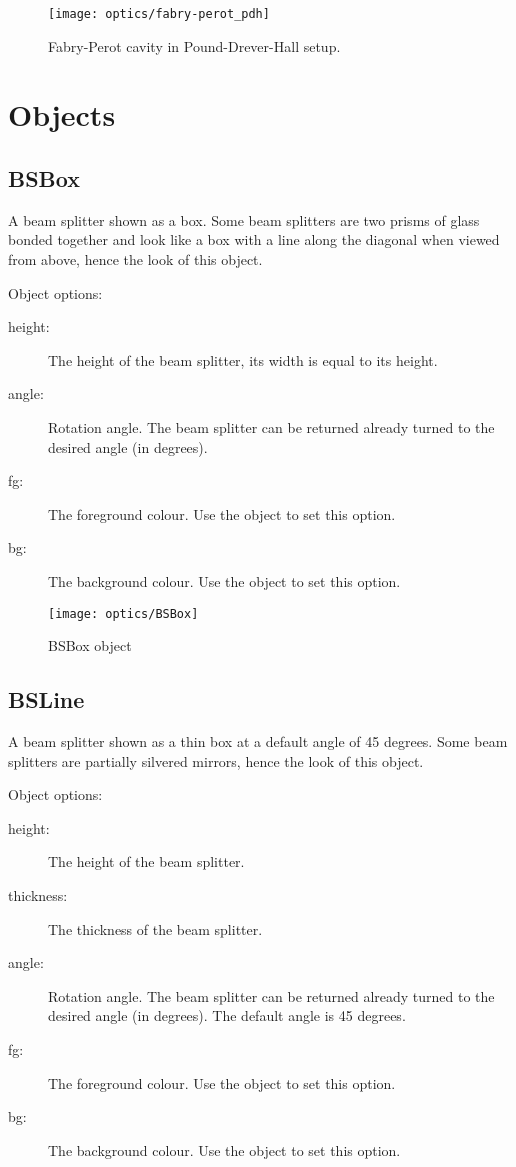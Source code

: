 \begin{figure}[ht]
\centerline{\texttt{[image: optics/fabry-perot\_pdh]}}
\caption{Fabry-Perot cavity in Pound-Drever-Hall setup.}
\label{fig:fabry-perot-pdh}
\end{figure}

\section{Objects}

\subsection{BSBox}

A beam splitter shown as a box.  Some beam splitters are two prisms of glass
bonded together and look like a box with a line along the diagonal
when viewed from above, hence the look of this object.

Object options:
\begin{description}
\item[height:] The height of the beam splitter, its width is equal to its
height.
\item[angle:] Rotation angle.  The beam splitter can be returned already
turned to the desired angle (in degrees).
\item[fg:] The foreground colour.  Use the  object to set this
option.
\item[bg:] The background colour.  Use the  object to set this
option.
\end{description}

\begin{figure}[!ht]
\centerline{\texttt{[image: optics/BSBox]}}
\caption{BSBox object}
\label{fig:bsbox}
\end{figure}

\subsection{BSLine}

A beam splitter shown as a thin box at a default angle of 45 degrees.  Some
beam splitters are partially silvered mirrors, hence the look of this
object.

Object options:
\begin{description}
\item[height:] The height of the beam splitter.
\item[thickness:] The thickness of the beam splitter.
\item[angle:] Rotation angle.  The beam splitter can be returned already
turned to the desired angle (in degrees).  The default angle is 45 degrees.
\item[fg:] The foreground colour.  Use the  object to set this
option.
\item[bg:] The background colour.  Use the  object to set this
option.
\end{description}

